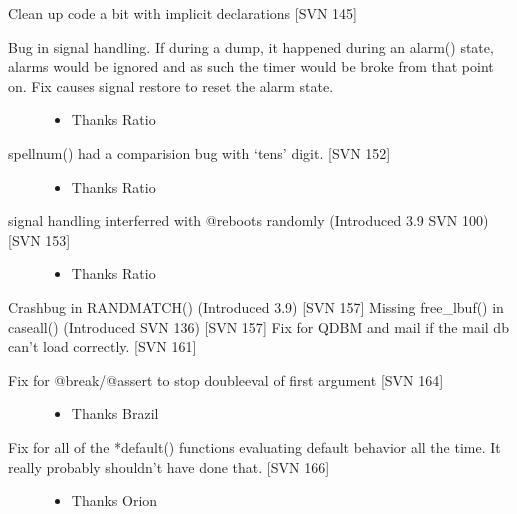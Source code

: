 \documentclass[letterpaper,10pt,english]{sphinxmanual}
\begin{document}
\sphinxAtStartPar
Clean up code a bit with implicit declarations {[}SVN 145{]}
\begin{description}
\item[{Bug in signal handling.  If during a dump, it happened during an alarm() state, alarms would be ignored and as such the timer would be broke from that point on.  Fix causes signal restore to re\sphinxhyphen{}set the alarm state.}] \leavevmode\begin{itemize}
\item {} 
\sphinxAtStartPar
Thanks Ratio

\end{itemize}

\item[{spellnum() had a comparision bug with ‘tens’ digit.  {[}SVN 152{]}}] \leavevmode\begin{itemize}
\item {} 
\sphinxAtStartPar
Thanks Ratio

\end{itemize}

\item[{signal handling interferred with @reboots randomly (Introduced 3.9 SVN 100) {[}SVN 153{]}}] \leavevmode\begin{itemize}
\item {} 
\sphinxAtStartPar
Thanks Ratio

\end{itemize}

\end{description}

\sphinxAtStartPar
Crashbug in RANDMATCH() (Introduced 3.9) {[}SVN 157{]}
Missing free\_lbuf() in caseall() (Introduced SVN 136) {[}SVN 157{]}
Fix for QDBM and mail if the mail db can’t load correctly. {[}SVN 161{]}
\begin{description}
\item[{Fix for @break/@assert to stop double\sphinxhyphen{}eval of first argument {[}SVN 164{]}}] \leavevmode\begin{itemize}
\item {} 
\sphinxAtStartPar
Thanks Brazil

\end{itemize}

\item[{Fix for all of the *default() functions evaluating default behavior all the time.  It really probably shouldn’t have done that.  {[}SVN 166{]}}] \leavevmode\begin{itemize}
\item {} 
\sphinxAtStartPar
Thanks Orion

\end{itemize}

\end{description}
\end{document}
